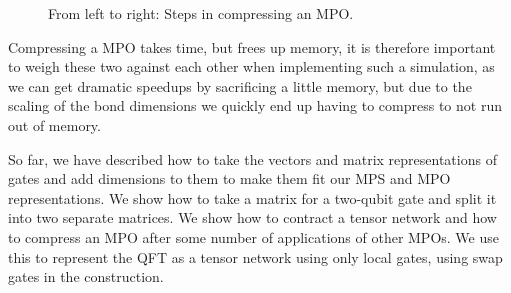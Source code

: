 \begin{figure}[H]
{
    }
    \caption{From left to right: Steps in compressing an MPO.}
    \label{fig:compress}
\end{figure}
\noindent 
Compressing a MPO takes time, but frees up memory, it is therefore important to weigh these two against each other when implementing such a simulation, as we can get dramatic speedups by sacrificing a little memory, but due to the scaling of the bond dimensions we quickly end up having to compress to not run out of memory. 

\vspace{\baselineskip}
\noindent
So far, we have described how to take the vectors and matrix representations of gates and add dimensions to them to make them fit our MPS and MPO representations. We show how to take a matrix for a two-qubit gate and split it into two separate matrices. We show how to contract a tensor network and how to compress an MPO after some number of applications of other MPOs. We use this to represent the QFT as a tensor network using only local gates, using swap gates in the construction. 

